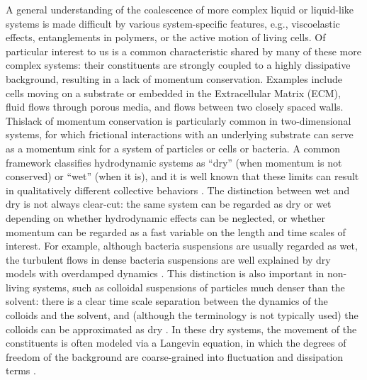 \documentclass[%
reprint,
amsmath,amssymb,
aps,
]{revtex4-2}
\begin{document}
	A general understanding of the coalescence of more complex liquid or liquid-like systems is made difficult by various system-specific features, e.g., viscoelastic effects, entanglements in polymers, or the active motion of living cells. Of particular interest to us is a common characteristic shared by many of these more complex systems: their constituents are strongly coupled to a highly dissipative background, resulting in a lack of momentum conservation. Examples include cells moving on a substrate or embedded in the Extracellular Matrix (ECM), fluid flows through porous media, and flows between two closely spaced walls. Thislack of momentum conservation is particularly common in two-dimensional systems, for which frictional interactions with an underlying substrate can serve as a momentum sink for a system of particles or cells or bacteria. A common framework classifies hydrodynamic systems as ``dry'' (when momentum is not conserved) or ``wet'' (when it is), and it is well known that these limits can result in qualitatively different collective behaviors \cite{marchetti2013hydrodynamics,doostmohammadi2016stabilization}. The distinction between wet and dry is not always clear-cut: the same system can be regarded as dry or wet depending on whether hydrodynamic effects can be neglected, or whether momentum can be regarded as a fast variable on the length and time scales of interest. For example, although bacteria suspensions are usually regarded as wet, the turbulent flows in dense bacteria suspensions are well explained by dry models with overdamped dynamics \cite{wensink2012meso}. This distinction is also important in non-living systems, such as colloidal suspensions of particles much denser than the solvent: there is a clear time scale separation between the dynamics of the colloids and the solvent, and (although the terminology is not typically used) the colloids can be approximated as dry \cite{hauge1973fluctuating,snook2006langevin}. In these dry systems, the movement of the constituents is often modeled via a Langevin equation, in which the degrees of freedom of the background are coarse-grained into fluctuation and dissipation terms \cite{espanol2004statistical}. 
	
\end{document}
